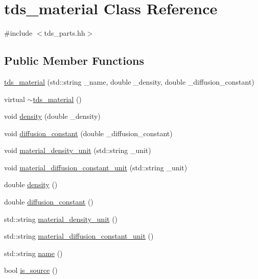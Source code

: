 \hypertarget{classtds__material}{\section{tds\-\_\-material Class Reference}
\label{classtds__material}
}


{\ttfamily \#include $<$tds\-\_\-parts.\-hh$>$}

\subsection*{Public Member Functions}
\begin{DoxyCompactItemize}
\item 
\hyperlink{classtds__material_af5fb49cd6a56b7eec0bd5c534327c987}{tds\-\_\-material} (std\-::string \-\_\-name, double \-\_\-density, double \-\_\-diffusion\-\_\-constant)
\item 
virtual \hyperlink{classtds__material_ad81f9ebe4bf33e2443479827f7d05b61}{$\sim$tds\-\_\-material} ()
\item 
void \hyperlink{classtds__material_ae1daf38db1671338e414dea7fa97b9f5}{density} (double \-\_\-density)
\item 
void \hyperlink{classtds__material_a26af9e8081aa8bde0fc2eac50b2b6c84}{diffusion\-\_\-constant} (double \-\_\-diffusion\-\_\-constant)
\item 
void \hyperlink{classtds__material_ad3875511cdb690c12fda10b1c8633b61}{material\-\_\-density\-\_\-unit} (std\-::string \-\_\-unit)
\item 
void \hyperlink{classtds__material_a58e27f901a1e39920282b8eb717a26b3}{material\-\_\-diffusion\-\_\-constant\-\_\-unit} (std\-::string \-\_\-unit)
\item 
double \hyperlink{classtds__material_a43ff0d801d23708b91d8ba1dfecb2c42}{density} ()
\item 
double \hyperlink{classtds__material_a8110986dcbebd04a3e80fb8f5eb3d6db}{diffusion\-\_\-constant} ()
\item 
std\-::string \hyperlink{classtds__material_a15016461ba5979216d18999ee7f5095c}{material\-\_\-density\-\_\-unit} ()
\item 
std\-::string \hyperlink{classtds__material_aeba2d3922cb11dc35d21c8951cf8e42e}{material\-\_\-diffusion\-\_\-constant\-\_\-unit} ()
\item 
std\-::string \hyperlink{classtds__material_ab47ac26347c2abeba02060b33db00eeb}{name} ()
\item 
bool \hyperlink{classtds__material_ae35dd97014996e55189b7a0477653639}{is\-\_\-source} ()
\end{DoxyCompactItemize}


